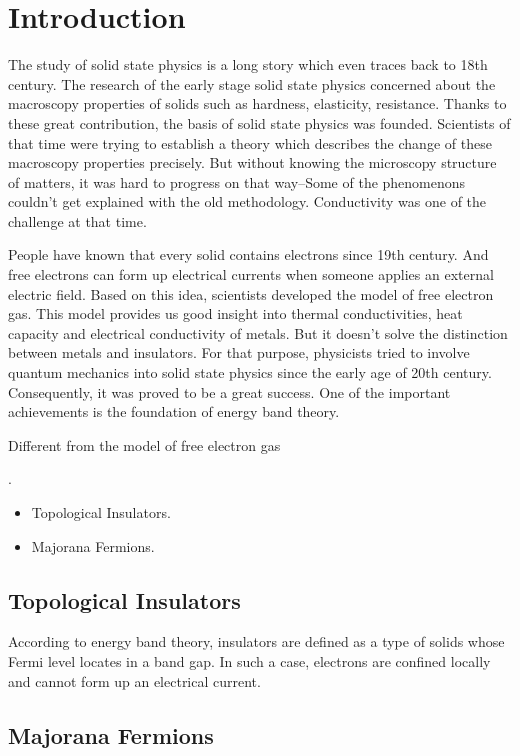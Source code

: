 \chapter{\label{chap:intr}Introduction}

The study of solid state physics is a long story which even traces back to 18th century. The research of the early stage solid state physics concerned about the macroscopy properties of solids such as hardness, elasticity, resistance. Thanks to these great contribution, the basis of solid state physics was founded. Scientists of that time were trying to establish a theory which describes the change of these macroscopy properties precisely. But without knowing the microscopy structure of matters, it was hard to progress on that way--Some of the phenomenons couldn't get explained with the old methodology. Conductivity was one of the challenge at that time.

People have known that every solid contains electrons since 19th century. And free electrons can form up electrical currents when someone applies an external electric field. Based on this idea, scientists developed the model of free electron gas. This model provides us good insight into thermal conductivities, heat capacity and electrical conductivity of metals. But it doesn't solve the distinction between metals and insulators. For that purpose, physicists tried to involve quantum mechanics into solid state physics since the early age of 20th century. Consequently, it was proved to be a great success. One of the important achievements is the foundation of energy band theory.

Different from the model of free electron gas 

\cite{einstein1905electrodynamics}.
\begin{itemize}
	\item Topological Insulators.
	\item Majorana Fermions.
\end{itemize}

\clearpage

\section{\label{sec:den_fun_the}Topological Insulators}

According to energy band theory, insulators are defined as a type of solids whose Fermi level locates in a band gap. In such a case, electrons are confined locally and cannot form up an electrical current. 

\section{\label{sec:maj_fer}Majorana Fermions}